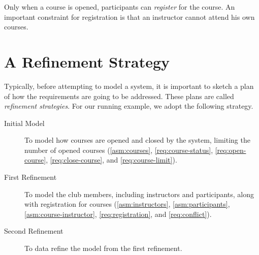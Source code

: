 Only when a course is opened, participants can \emph{register} for the
course.  An important constraint for registration is that an
instructor cannot attend his own courses.
\begin{requirements}
  \ReqSpacing
\end{requirements}

\section{A Refinement Strategy}
\label{sec:refinement-strategy}

Typically, before attempting to model a system, it is important to
sketch a plan of how the requirements are going to be addressed.
These plans are called \emph{refinement strategies}.  For our running
example, we adopt the following strategy.
\begin{description}
\item[Initial Model] To model how courses are opened and closed by the
  system, limiting the number of opened courses (\ref{asm:courses},
  \ref{req:course-status}, \ref{req:open-course}, \ref{req:close-course}, and
  \ref{req:course-limit}).
\item[First Refinement] To model the club members, including
  instructors and participants, along with registration for courses
  (\ref{asm:instructors}, \ref{asm:participants},
  \ref{asm:course-instructor}, \ref{req:registration}, and
  \ref{req:conflict}).
\item[Second Refinement] To data refine the model from the first refinement.
\end{description}

